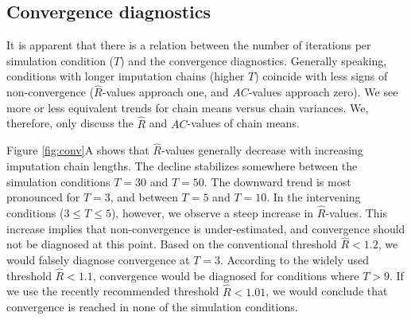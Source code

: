 \documentclass[article]{jss}
\begin{document}
\subsection{Convergence diagnostics}
It is apparent that there is a relation between the number of iterations per simulation condition ($T$) and the convergence diagnostics. Generally speaking, conditions with longer imputation chains (higher $T$) coincide with less signs of non-convergence ($\widehat{R}$-values approach one, and $AC$-values approach zero). We see more or less equivalent trends for chain means versus chain variances. We, therefore, only discuss the $\widehat{R}$ and $AC$-values of chain means. %

Figure \ref{fig:conv}A shows that $\widehat{R}$-values generally decrease with increasing imputation chain lengths. The decline stabilizes somewhere between the simulation conditions $T=30$ and $T=50$. The downward trend is most pronounced for $T=3$, and between $T = 5$ and $T = 10$. In the intervening conditions ($3 \leq T \leq 5$), however, we observe a steep increase in $\widehat{R}$-values. This increase implies that non-convergence is under-estimated, and convergence should not be diagnosed at this point. Based on the conventional threshold $\widehat{R} < 1.2$, we would falsely diagnose convergence at $T=3$. According to the widely used threshold $\widehat{R} < 1.1$, convergence would be diagnosed for conditions where $T>9$. If we use the recently recommended threshold $\widehat{R} < 1.01$, we would conclude that convergence is reached in none of the simulation conditions. %



\end{document}
